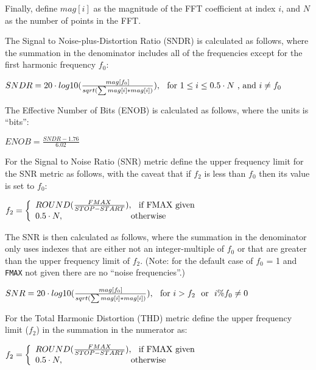 Finally, define $mag[i]$ as the magnitude of the FFT coefficient at index $i$, and $N$ as
the number of points in the FFT.

The Signal to Noise-plus-Distortion Ratio (SNDR) is calculated as follows, where the summation
in the denominator includes all of the frequencies except for the first harmonic frequency $f_{0}$:

$SNDR = 20 \cdot log10(\frac{mag[f_{0}]}{sqrt(\sum mag[i]*mag[i])}),\hspace*{0.1in}\textrm{for}~1 \leq i \leq 0.5 \cdot N ~\textrm{, and}~i \neq f_{0}$

The Effective Number of Bits (ENOB) is calculated as follows, where the units is ``bits'':

$ENOB = \frac{SNDR - 1.76}{6.02}$

For the Signal to Noise Ratio (SNR) metric define the upper frequency limit for the SNR metric as follows,
with the caveat that if $f_{2}$ is less than $f_{0}$ then its value is set to $f_{0}$:

$f_{2}=\left\{\begin{array}{ll}ROUND(\frac{FMAX}{STOP-START}),\hspace*{0.1in}\textrm{if FMAX given}\\
   0.5 \cdot N,\hspace*{1.1in}\textrm{otherwise}\end{array}\right.$

The SNR is then calculated as follows, where the summation in the denominator only uses indexes that
are either not an integer-multiple of $f_{0}$ or that are greater than the upper frequency limit of $f_{2}$.
(Note: for the default case of $f_{0}$ = 1 and \texttt{FMAX} not given there are no ``noise frequencies''.)

$SNR = 20 \cdot log10(\frac{mag[f_{0}]}{sqrt(\sum mag[i]*mag[i])}),\hspace*{0.1in}\textrm{for}~i > f_{2} ~\textrm{ or }~i\%f_{0} \ne 0$

For the Total Harmonic Distortion (THD) metric define the upper frequency limit ($f_{2}$) in
the summation in the numerator as:

$f_{2}=\left\{\begin{array}{ll}ROUND(\frac{FMAX}{STOP-START}),\hspace*{0.1in}\textrm{if FMAX given} \\ 0.5 \cdot N,\hspace*{1.1in}\textrm{otherwise}\end{array}\right.$

